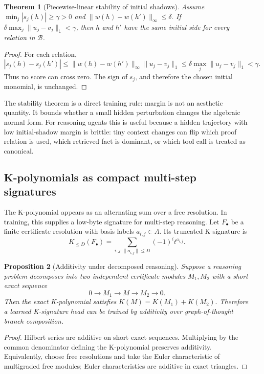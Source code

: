 \documentclass[11pt]{article}
\newtheorem{theorem}{Theorem}[section]
\newtheorem{proposition}[theorem]{Proposition}
\theoremstyle{definition}
\begin{document}
\begin{theorem}[Piecewise-linear stability of initial shadows]
Assume \(\min_j |s_j(h)|\ge \gamma>0\) and \(\|w(h)-w(h')\|_\infty\le \delta\).  If \(\delta\max_j\|u_j-v_j\|_1<\gamma\), then \(h\) and \(h'\) have the same initial side for every relation in \(\mathcal B\).
\end{theorem}

\begin{proof}
For each relation,
\[
 |s_j(h)-s_j(h')|\le \|w(h)-w(h')\|_\infty\|u_j-v_j\|_1
 \le \delta\max_j\|u_j-v_j\|_1<\gamma.
\]
Thus no score can cross zero.  The sign of \(s_j\), and therefore the chosen initial monomial, is unchanged.
\end{proof}

The stability theorem is a direct training rule: margin is not an aesthetic quantity.  It bounds whether a small hidden perturbation changes the algebraic normal form.  For reasoning agents this is useful because a hidden trajectory with low initial-shadow margin is brittle: tiny context changes can flip which proof relation is used, which retrieved fact is dominant, or which tool call is treated as canonical.

\subsection{K-polynomials as compact multi-step signatures}
The K-polynomial appears as an alternating sum over a free resolution.  In training, this supplies a low-byte signature for multi-step reasoning.  Let \(F_\bullet\) be a finite certificate resolution with basis labels \(a_{i,j}\in A\).  Its truncated K-signature is
\[
  K_{\le D}(F_\bullet)=\sum_{i,j: \|a_{i,j}\|\le D}(-1)^i t^{a_{i,j}}.
\]

\begin{proposition}[Additivity under decomposed reasoning]
Suppose a reasoning problem decomposes into two independent certificate modules \(M_1,M_2\) with a short exact sequence
\[
0\to M_1\to M\to M_2\to 0.
\]
Then the exact K-polynomial satisfies \(K(M)=K(M_1)+K(M_2)\).  Therefore a learned K-signature head can be trained by additivity over graph-of-thought branch composition.
\end{proposition}

\begin{proof}
Hilbert series are additive on short exact sequences.  Multiplying by the common denominator defining the K-polynomial preserves additivity.  Equivalently, choose free resolutions and take the Euler characteristic of multigraded free modules; Euler characteristics are additive in exact triangles.
\end{proof}
\end{document}
